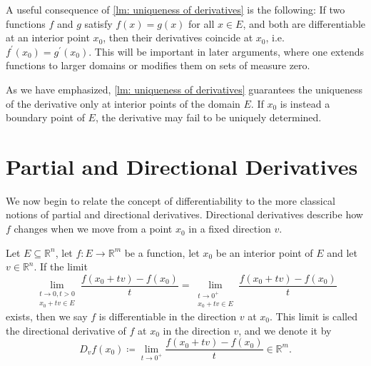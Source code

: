 \begin{remark}
    A useful consequence of \autoref{lm: uniqueness of derivatives} is the following: If two functions \(f\) and \(g\) satisfy \(f(x) = g(x)\) for all \(x \in E\), and both are differentiable at an interior point \(x_0\), then their derivatives coincide at \(x_0\), i.e. \(f^{\prime} (x_0) = g^{\prime} (x_0)\). This will be important in later arguments, where one extends functions to larger domains or modifies them on sets of measure zero.       
\end{remark}

\begin{remark}
    As we have emphasized, \autoref{lm: uniqueness of derivatives} guarantees the uniqueness of the derivative only at interior points of the domain \(E\). If \(x_0\) is instead a boundary point of \(E\), the derivative may fail to be uniquely determined.    
\end{remark}

\section{Partial and Directional Derivatives}

We now begin to relate the concept of differentiability to the more classical notions of partial and directional derivatives. Directional derivatives describe how \(f\) changes when we move from a point \(x_0\) in a fixed direction \(v\).   

\begin{definition}
    Let \(E \subseteq \mathbb{R} ^n\), let \(f : E \to \mathbb{R} ^m\) be a function, let \(x_0\) be an interior point of \(E\) and let \(v \in \mathbb{R} ^n\). If the limit
    \[
        \lim_{\substack{t \to 0, t > 0 \\ x_0 + tv \in E}} \frac{f(x_0 + tv) - f(x_0)}{t} = \lim_{\substack{t \to 0^+ \\ x_0 + tv \in E}} \frac{f(x_0 + tv) - f(x_0)}{t} 
    \]     
    exists, then we say \(f\) is differentiable in the direction \(v\) at \(x_0\). This limit is called the directional derivative of \(f\) at \(x_0\) in the direction \(v\), and we denote it by 
    \[
        D_v f(x_0) \coloneqq \lim_{t \to 0^+} \frac{f(x_0 + tv) - f(x_0)}{t} \in \mathbb{R} ^m.
    \]   
\end{definition}

